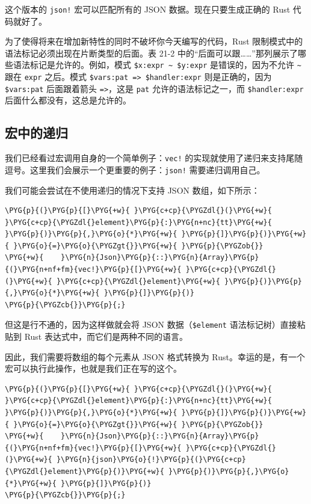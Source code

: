 这个版本的 \texttt{json!} 宏可以匹配所有的 JSON 数据。现在只要生成正确的 Rust 代码就好了。

为了使得将来在增加新特性的同时不破坏你今天编写的代码，Rust 限制模式中的语法标记必须出现在片断类型的后面。表 21-2 中的“后面可以跟……”那列展示了哪些语法标记是允许的。例如，模式 \texttt{\$x:expr \textasciitilde{} \$y:expr} 是错误的，因为不允许 \texttt{\textasciitilde{}} 跟在 \texttt{expr} 之后。模式 \texttt{\$vars:pat => \$handler:expr} 则是正确的，因为 \texttt{\$vars:pat} 后面跟着箭头 \texttt{=>}，这是 \texttt{pat} 允许的语法标记之一，而 \texttt{\$handler:expr} 后面什么都没有，这总是允许的。

\subsection{宏中的递归}

我们已经看过宏调用自身的一个简单例子：\texttt{vec!} 的实现就使用了递归来支持尾随逗号。这里我们会展示一个更重要的例子：\texttt{json!} 需要递归调用自己。

我们可能会尝试在不使用递归的情况下支持 JSON 数组，如下所示：

\begin{Verbatim}[commandchars=\\\{\},breaklines=true,breakanywhere=true,fontsize=\codefont,xleftmargin=17bp]
\PYG{p}{(}\PYG{p}{[}\PYG{+w}{ }\PYG{c+cp}{\PYGZdl{}(}\PYG{+w}{ }\PYG{c+cp}{\PYGZdl{}element}\PYG{p}{:}\PYG{n+nc}{tt}\PYG{+w}{ }\PYG{p}{)}\PYG{p}{,}\PYG{o}{*}\PYG{+w}{ }\PYG{p}{]}\PYG{p}{)}\PYG{+w}{ }\PYG{o}{=}\PYG{o}{\PYGZgt{}}\PYG{+w}{ }\PYG{p}{\PYGZob{}}
\PYG{+w}{    }\PYG{n}{Json}\PYG{p}{::}\PYG{n}{Array}\PYG{p}{(}\PYG{n+nf+fm}{vec!}\PYG{p}{[}\PYG{+w}{ }\PYG{c+cp}{\PYGZdl{}(}\PYG{+w}{ }\PYG{c+cp}{\PYGZdl{}element}\PYG{+w}{ }\PYG{p}{)}\PYG{p}{,}\PYG{o}{*}\PYG{+w}{ }\PYG{p}{]}\PYG{p}{)}
\PYG{p}{\PYGZcb{}}\PYG{p}{;}
\end{Verbatim}

但这是行不通的，因为这样做就会将 JSON 数据（\texttt{\$element} 语法标记树）直接粘贴到 Rust 表达式中，而它们是两种不同的语言。

因此，我们需要将数组的每个元素从 JSON 格式转换为 Rust。幸运的是，有一个宏可以执行此操作，也就是我们正在写的这个。

\begin{Verbatim}[commandchars=\\\{\},breaklines=true,breakanywhere=true,fontsize=\codefont,xleftmargin=17bp]
\PYG{p}{(}\PYG{p}{[}\PYG{+w}{ }\PYG{c+cp}{\PYGZdl{}(}\PYG{+w}{ }\PYG{c+cp}{\PYGZdl{}element}\PYG{p}{:}\PYG{n+nc}{tt}\PYG{+w}{ }\PYG{p}{)}\PYG{p}{,}\PYG{o}{*}\PYG{+w}{ }\PYG{p}{]}\PYG{p}{)}\PYG{+w}{ }\PYG{o}{=}\PYG{o}{\PYGZgt{}}\PYG{+w}{ }\PYG{p}{\PYGZob{}}
\PYG{+w}{    }\PYG{n}{Json}\PYG{p}{::}\PYG{n}{Array}\PYG{p}{(}\PYG{n+nf+fm}{vec!}\PYG{p}{[}\PYG{+w}{ }\PYG{c+cp}{\PYGZdl{}(}\PYG{+w}{ }\PYG{n}{json}\PYG{o}{!}\PYG{p}{(}\PYG{c+cp}{\PYGZdl{}element}\PYG{p}{)}\PYG{+w}{ }\PYG{p}{)}\PYG{p}{,}\PYG{o}{*}\PYG{+w}{ }\PYG{p}{]}\PYG{p}{)}
\PYG{p}{\PYGZcb{}}\PYG{p}{;}
\end{Verbatim}

